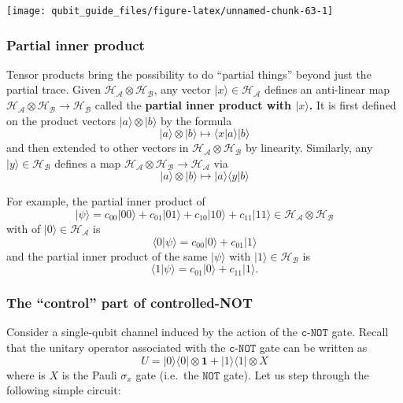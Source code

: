 \documentclass[fleqn]{article}
\begin{document}
\begin{center}\texttt{[image: qubit\_guide\_files/figure-latex/unnamed-chunk-63-1]} \end{center}

\hypertarget{partial-inner-product}{%
\subsubsection{Partial inner product}\label{partial-inner-product}}

Tensor products bring the possibility to do ``partial things'' beyond just the partial trace.
Given \(\mathcal{H}_{\mathcal{A}}\otimes\mathcal{H}_{\mathcal{B}}\), any vector \(|x\rangle\in\mathcal{H}_{\mathcal{A}}\) defines an anti-linear map \(\mathcal{H}_{\mathcal{A}}\otimes\mathcal{H}_{\mathcal{B}}\to\mathcal{H}_{\mathcal{B}}\) called the \textbf{partial inner product with \(|x\rangle\).}
It is first defined on the product vectors \(|a\rangle\otimes|b\rangle\) by the formula
\[
  |a\rangle\otimes|b\rangle
  \longmapsto \langle x|a\rangle|b\rangle
\]
and then extended to other vectors in \(\mathcal{H}_{\mathcal{A}}\otimes\mathcal{H}_{\mathcal{B}}\) by linearity.
Similarly, any \(|y\rangle\in\mathcal{H}_{\mathcal{B}}\) defines a map \(\mathcal{H}_{\mathcal{A}}\otimes\mathcal{H}_{\mathcal{B}}\to\mathcal{H}_{\mathcal{A}}\) via
\[
  |a\rangle\otimes|b\rangle
  \longmapsto |a\rangle\langle y|b\rangle
\]

For example, the partial inner product of
\[
  |\psi\rangle=c_{00}|00\rangle+c_{01}|01\rangle+c_{10}|10\rangle+c_{11}|11\rangle\in\mathcal{H}_{\mathcal{A}}\otimes\mathcal{H}_{\mathcal{B}}
\]
with of \(|0\rangle\in\mathcal{H}_{\mathcal{A}}\) is
\[
  \langle 0|\psi\rangle = c_{00}|0\rangle + c_{01}|1\rangle
\]
and the partial inner product of the same \(|\psi\rangle\) with \(|1\rangle\in\mathcal{H}_{\mathcal{B}}\) is
\[
  \langle 1|\psi\rangle = c_{01}|0\rangle + c_{11}|1\rangle.
\]

\hypertarget{control-controlled-NOT}{%
\subsubsection{The ``control'' part of controlled-NOT}\label{control-controlled-NOT}}

Consider a single-qubit channel induced by the action of the \(\texttt{c-NOT}\) gate.
Recall that the unitary operator associated with the \(\texttt{c-NOT}\) gate can be written as
\[
  U = |0\rangle\langle 0|\otimes\mathbf{1}+ |1\rangle\langle 1|\otimes X
\]
where is \(X\) is the Pauli \(\sigma_x\) gate (i.e.~the \(\texttt{NOT}\) gate).
Let us step through the following simple circuit:
\end{document}
